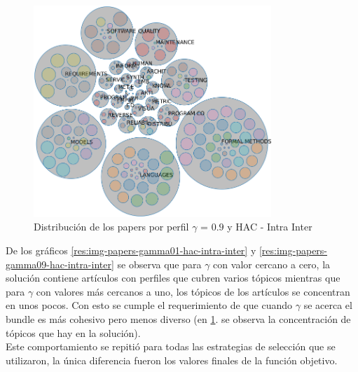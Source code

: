 \begin{figure}[H]
  \centering
    \includegraphics[width=0.8\textwidth]{resultados/papers/HAC/INTRA_INTER/bubbles-gamma-09.png}
  \caption{Distribución de los papers por perfil $\gamma$ = $0.9$ y HAC - Intra Inter}
  \label{res:img-papers-bubbles-gamma09-hac-intra-inter}
\end{figure}

De los gráficos \ref{res:img-papers-gamma01-hac-intra-inter} y \ref{res:img-papers-gamma09-hac-intra-inter} se observa que para $\gamma$ con valor cercano a cero, la solución contiene artículos con perfiles que cubren varios tópicos mientras que para $\gamma$ con valores más cercanos a uno, los tópicos de los artículos se concentran en unos pocos. Con esto se cumple el requerimiento de que cuando $\gamma$ se acerca el bundle es más cohesivo pero menos diverso (en \ref{res:img-papers-bubbles-gamma09-hac-intra-inter}. se observa la concentración de tópicos que hay en la solución).\\
Este comportamiento se repitió para todas las estrategias de selección que se utilizaron, la única diferencia fueron los valores finales de la función objetivo.
